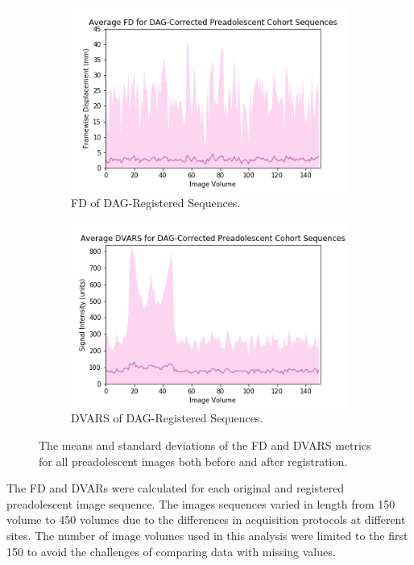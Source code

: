 \begin{figure}[]
	\begin{subfigure}{0.4\textwidth}
		\centering
		\includegraphics[width=1.0\textwidth]{6/figures/preads-dag-fd-150.png}
		\caption{FD of DAG-Registered Sequences.}
	\end{subfigure}
	\hspace{0.05\textwidth}
	\begin{subfigure}{0.4\textwidth}
		\centering
		\includegraphics[width=1.0\textwidth]{6/figures/preads-dag-dvars-150.png}
		\caption{DVARS of DAG-Registered Sequences.}
	\end{subfigure}
\caption{The means and standard deviations of the FD and DVARS metrics for all preadolescent images both before and after registration.}
\label{fig:pread-power-dists}
\end{figure}

The FD and DVARs were calculated for each original and registered preadolescent image sequence. The images sequences varied in length from 150 volume to 450 volumes due to the differences in acquisition protocols at different sites. The number of image volumes used in this analysis were limited to the first 150 to avoid the challenges of comparing data with missing values.

